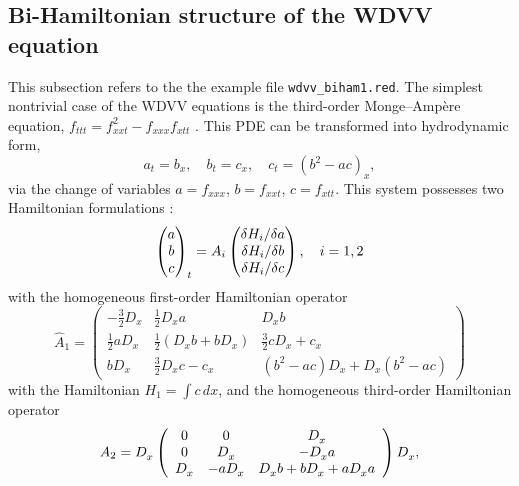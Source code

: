 \subsection{Bi-Hamiltonian structure of the WDVV equation}
\label{cdesec:bi-hamilt-struct-1}

This subsection refers to the the example file \texttt{wdvv\_biham1.red}.
The simplest nontrivial case of the WDVV equations is the third-order
Monge--Amp\`ere equation, $f_{ttt} = f_{xxt}^2 - f_{xxx}f_{xtt}$
\cite{Dubrovin:96}. This PDE can be transformed into hydrodynamic form,
\begin{equation*}
  a_t=b_x,\quad b_t=c_x,\quad c_t=(b^2-ac)_x,
\end{equation*}
via the change of variables $a=f_{xxx}$, $b=f_{xxt}$, $c=f_{xtt}$. This system
possesses two Hamiltonian formulations \cite{Ferapontov:97}:
\begin{equation*}
  \begin{pmatrix}
    a \\ b \\ c
  \end{pmatrix}_t =A_i
  \begin{pmatrix}
    \fd{H_i}{a}\\ \fd{H_i}{b} \\ \fd{H_i}{c}
  \end{pmatrix},\quad i=1,2
\end{equation*}
with the homogeneous first-order Hamiltonian operator
\begin{displaymath}
\hat{A}_{1}=%
\begin{pmatrix}
-\frac{3}{2}D _{x}^{{}} & \frac{1}{2}D _{x}^{{}}a & D
_{x}^{{}}b \\ 
\frac{1}{2}aD _{x}^{{}} & \frac{1}{2}(D _{x}^{{}}b+bD
_{x}^{{}}) & \frac{3}{2}cD _{x}^{{}}+c_{x} \\ 
bD _{x}^{{}} & \frac{3}{2}D _{x}^{{}}c-c_{x} & 
(b^{2}-ac)D _{x}^{{}}+D _{x}^{{}}(b^{2}-ac)%
\end{pmatrix}
\end{displaymath}%
with the Hamiltonian $H_1 = \int c \, dx$,
and the homogeneous third-order Hamiltonian operator
$$
  A_2= D_x^{}\left(
    \begin{array}{ccc}
      0 & 0 & \displaystyle D_x^{} \\
      0 & \displaystyle D_x^{} & -\displaystyle D_x^{}a \\
      \displaystyle D_x^{} & -a\displaystyle D_x^{} &
      \displaystyle D_x^{}b + bD_x^{} + a D_x^{} a
    \end{array}\right)
  D_x^{},
$$
